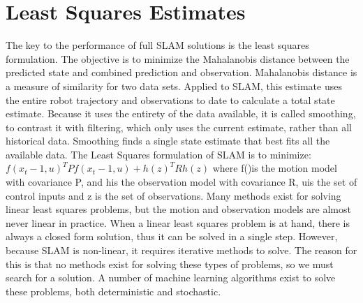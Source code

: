 \documentclass[12pt]{report}
\begin{document}
\section{ Least Squares Estimates }

The key to the performance of full SLAM solutions is the least squares formulation.  The objective is to minimize the Mahalanobis distance between the predicted state and combined prediction and observation.  Mahalanobis distance is a measure of similarity for two data sets.  Applied to SLAM, this estimate uses the entire robot trajectory and observations to date to calculate a total state estimate.  Because it uses the entirety of the data available, it is called smoothing, to contrast it with filtering, which only uses the current estimate, rather than all historical data.  Smoothing finds a single state estimate that best fits all the available data.  
	The Least Squares formulation of SLAM is to minimize:
$f(x_t-1,u)^TPf(x_t-1,u) + h(z)^TRh(z) $  
	where f()is the motion model with covariance P, and his the observation model with covariance R, uis the set of control inputs and z is the set of observations.
 Many methods exist for solving linear least squares problems, but the motion and observation models are almost never linear in practice.  When a linear least squares problem is at hand, there is always a closed form solution, thus it can be solved in a single step.  However, because SLAM is non-linear, it requires iterative methods to solve.  The reason for this is that no methods exist for solving these types of problems, so we must search for a solution.  A number of machine learning algorithms exist to solve these problems, both deterministic and stochastic.
\end{document}
